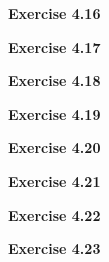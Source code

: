 \documentclass{article}
\begin{document}
\bigskip

\begin{framed}
    \noindent \textbf{Exercise 4.16}
    
    \medskip
    
    
\end{framed}


\bigskip

\begin{framed}
    \noindent \textbf{Exercise 4.17}
    
    \medskip
    
    
\end{framed}


\bigskip

\begin{framed}
    \noindent \textbf{Exercise 4.18}
    
    \medskip
    
    
\end{framed}


\bigskip

\begin{framed}
    \noindent \textbf{Exercise 4.19}
    
    \medskip
    
    
\end{framed}


\bigskip

\begin{framed}
    \noindent \textbf{Exercise 4.20}
    
    \medskip
    
    
\end{framed}


\bigskip

\begin{framed}
    \noindent \textbf{Exercise 4.21}
    
    \medskip
    
    
\end{framed}


\bigskip

\begin{framed}
    \noindent \textbf{Exercise 4.22}
    
    \medskip
    
    
\end{framed}


\bigskip

\begin{framed}
    \noindent \textbf{Exercise 4.23}
    
    \medskip
    
    
\end{framed}
\end{document}
